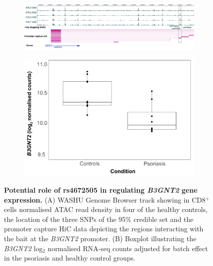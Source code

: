 \begin{figure}[htbp]
\centering
\begin{subfigure}{0.5\textwidth}
\centering
\includegraphics[width=\textwidth]{./Results2/pdfs/B3GNT2_HiC_WASHU_track}
\caption{\textbf{}}
\end{subfigure}
\begin{subfigure}{0.5\textwidth}
\centering
\includegraphics[width=\textwidth]{./Results2/pdfs/RNA_PS_CTL_B3GNT2_expression_CD8}
\caption{\textbf{}}
\end{subfigure}
\caption[Potential role of rs4672505 in regulating \textit{B3GNT2} gene expression.]{\textbf{Potential role of rs4672505 in regulating \textit{B3GNT2} gene expression.} (A) WASHU Genome Browser track showing in CD8$^+$ cells normalised ATAC read density in four of the healthy controls, the location of the three SNPs of the 95\% credible set and the promoter capture HiC data depicting the regions interacting with the bait at the \textit{B3GNT2} promoter. (B) Boxplot illustrating the \textit{B3GNT2} log$_2$ normalised RNA-seq counts adjusted for batch effect in the psoriasis and healthy control groups.}
\label{figure:RNA_chromatin_interaction_B3GNT2}
\end{figure} 



